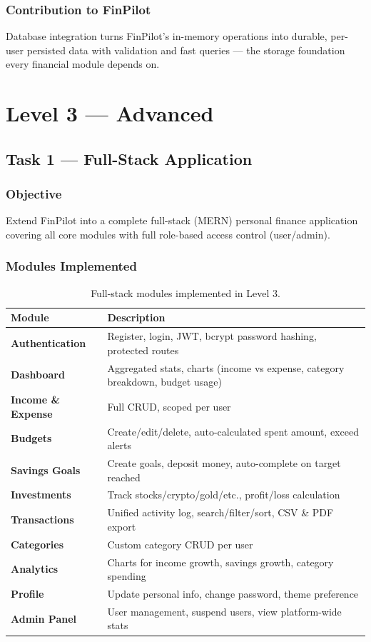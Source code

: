 \documentclass[11pt,a4paper]{report}
\begin{document}
\subsection{Contribution to FinPilot}
Database integration turns FinPilot's in-memory operations into durable,
per-user persisted data with validation and fast queries --- the storage
foundation every financial module depends on.

\chapter{Level 3 --- Advanced}

\section{Task 1 --- Full-Stack Application}

\subsection{Objective}
Extend FinPilot into a complete full-stack (MERN) personal finance application
covering all core modules with full role-based access control (user/admin).

\subsection{Modules Implemented}
\begin{table}[H]
\centering
\begin{tabularx}{\linewidth}{>{\bfseries}l X}
\toprule
Module & Description \\
\midrule
Authentication    & Register, login, JWT, bcrypt password hashing, protected routes \\
Dashboard         & Aggregated stats, charts (income vs expense, category breakdown, budget usage) \\
Income \& Expense & Full CRUD, scoped per user \\
Budgets           & Create/edit/delete, auto-calculated spent amount, exceed alerts \\
Savings Goals     & Create goals, deposit money, auto-complete on target reached \\
Investments       & Track stocks/crypto/gold/etc., profit/loss calculation \\
Transactions      & Unified activity log, search/filter/sort, CSV \& PDF export \\
Categories        & Custom category CRUD per user \\
Analytics         & Charts for income growth, savings growth, category spending \\
Profile           & Update personal info, change password, theme preference \\
Admin Panel       & User management, suspend users, view platform-wide stats \\
\bottomrule
\end{tabularx}
\caption{Full-stack modules implemented in Level 3.}
\end{table}
\end{document}
